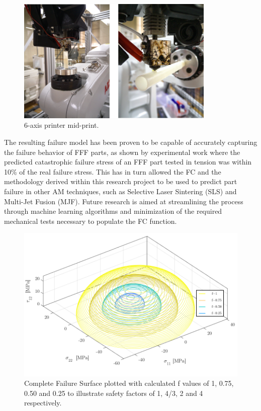 \documentclass[11pt,letterpaper]{article}
\begin{document}
\begin{figure}[h]
	\center
	\includegraphics[height=6cm, keepaspectratio]{otto2}
	\captionsetup{justification=centering} %
	\caption[6-axis printer]{6-axis printer mid-print.} \label{fig:otto2}
\end{figure}    

The resulting failure model has been proven to be capable of accurately capturing the failure behavior of FFF parts, as shown by experimental work where the predicted catastrophic failure stress of an FFF part tested in tension was within 10\% of the real failure stress. This has in turn allowed the FC and the methodology derived within this research project to be used to predict part failure in other AM techniques, such as Selective Laser Sintering (SLS) and Multi-Jet Fusion (MJF). Future research is aimed at streamlining the process through machine learning algorithms and minimization of the required mechanical tests necessary to populate the FC function.

\begin{figure}[!htbp]
	\center
	\includegraphics[width=\linewidth, keepaspectratio]{final_surface}
	\captionsetup{justification=centering} %
	\caption[Complete Failure Surface]{Complete Failure Surface plotted with calculated f values of 1, 0.75, 0.50 and 0.25 to illustrate safety factors of 1, 4/3, 2 and 4 respectively.} \label{fig:fullfs}
\end{figure}
\end{document}
